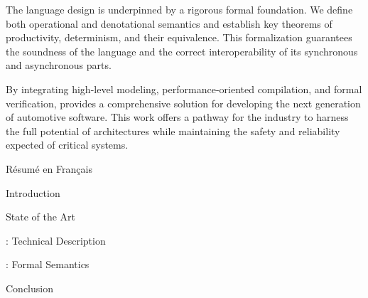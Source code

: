 \documentclass[12pt]{report}
\begin{document}
The language design is underpinned by a rigorous formal foundation. We define both operational and
denotational semantics and establish key theorems of productivity, determinism, and their
equivalence. This formalization guarantees the soundness of the language and the correct
interoperability of its synchronous and asynchronous parts.

By integrating high-level modeling, performance-oriented compilation, and formal verification,
\GRust provides a comprehensive solution for developing the next generation of automotive software.
This work offers a pathway for the industry to harness the full potential of \sdv architectures
while maintaining the safety and reliability expected of critical systems.

\tableofcontents

\let\origaddvspace\addvspace
\renewcommand{\addvspace}[1]{}
\listoffigures
\listoftables
\renewcommand{\lstlistlistingname}{List of Listings}
\lstlistoflistings
\renewcommand{\addvspace}[1]{\origaddvspace{#1}}

\begin{chapterWithToc}{Résumé en Français}{\label{cha:resume}}
    
\end{chapterWithToc}

\begin{chapterWithToc}{Introduction}{\label{cha:intro}}
    
\end{chapterWithToc}

\begin{chapterWithToc}{State of the Art}{\label{cha:sota}}
    
\end{chapterWithToc}

\begin{chapterWithToc}{\GRust: Technical Description}{\label{cha:grust}}
    
\end{chapterWithToc}

\begin{chapterWithToc}{\GRust: Formal Semantics}{\label{cha:semantics}}
    
\end{chapterWithToc}

\begin{chapterWithToc}{Conclusion}{\label{cha:conclusion}}
    
\end{chapterWithToc}


\end{document}
